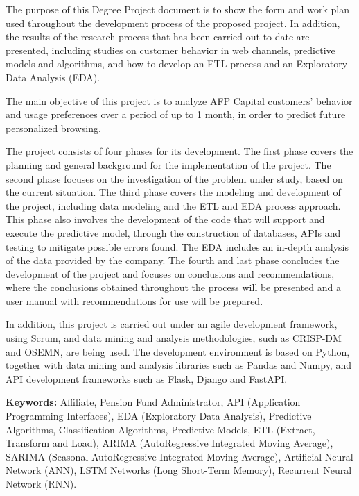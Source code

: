The purpose of this Degree Project document is to show the form and work plan used throughout the development process of the proposed project. In addition, the results of the research process that has been carried out to date are presented, including studies on customer behavior in web channels, predictive models and algorithms, and how to develop an ETL process and an Exploratory Data Analysis (EDA).

The main objective of this project is to analyze AFP Capital customers' behavior and usage preferences over a period of up to 1 month, in order to predict future personalized browsing.

The project consists of four phases for its development. The first phase covers the planning and general background for the implementation of the project. The second phase focuses on the investigation of the problem under study, based on the current situation. The third phase covers the modeling and development of the project, including data modeling and the ETL and EDA process approach. This phase also involves the development of the code that will support and execute the predictive model, through the construction of databases, APIs and testing to mitigate possible errors found. The EDA includes an in-depth analysis of the data provided by the company. The fourth and last phase concludes the development of the project and focuses on conclusions and recommendations, where the conclusions obtained throughout the process will be presented and a user manual with recommendations for use will be prepared.

In addition, this project is carried out under an agile development framework, using Scrum, and data mining and analysis methodologies, such as CRISP-DM and OSEMN, are being used. The development environment is based on Python, together with data mining and analysis libraries such as Pandas and Numpy, and API development frameworks such as Flask, Django and FastAPI.

\textbf{Keywords:} Affiliate, Pension Fund Administrator, API (Application Programming Interfaces), EDA (Exploratory Data Analysis), Predictive Algorithms, Classification Algorithms, Predictive Models, ETL (Extract, Transform and Load), ARIMA (AutoRegressive Integrated Moving Average), SARIMA (Seasonal AutoRegressive Integrated Moving Average), Artificial Neural Network (ANN), LSTM Networks (Long Short-Term Memory), Recurrent Neural Network (RNN).